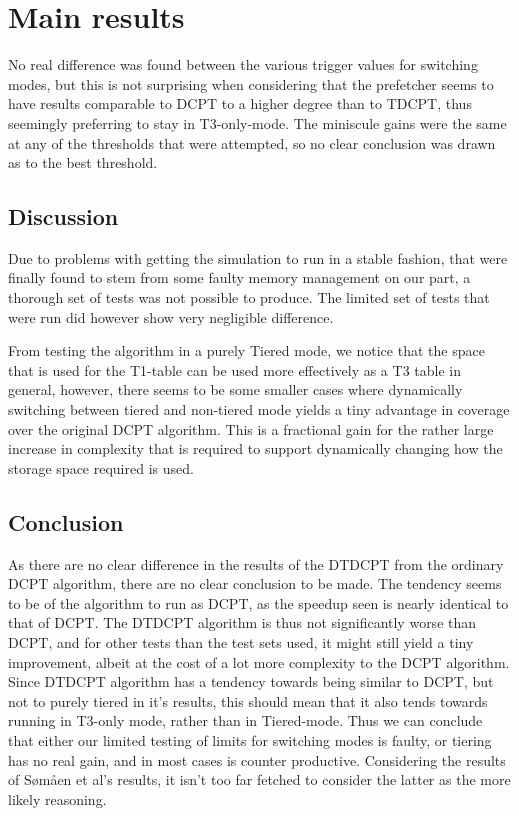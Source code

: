 \section{Main results}
No real difference was found between the various trigger values for switching modes,
but this is not surprising when considering that the prefetcher seems to have results
comparable to DCPT to a higher degree than to TDCPT, thus seemingly preferring to stay
in T3-only-mode. The miniscule gains were the same at any of the thresholds that were
attempted, so no clear conclusion was drawn as to the best threshold.

\subsection{Discussion}
Due to problems with getting the simulation to run in a stable fashion, that
were finally found to stem from some faulty memory management on our part, a
thorough set of tests was not possible to produce. The limited set of tests
that were run did however show very negligible difference.

From testing the algorithm in a purely Tiered mode, we notice that the
space that is used for the T1-table can be used more effectively as a T3
table in general, however, there seems to be some smaller cases where dynamically
switching between tiered and non-tiered mode yields a tiny advantage in coverage
over the original DCPT algorithm. This is a fractional gain for the rather
large increase in complexity that is required to support dynamically changing how
the storage space required is used.

\subsection{Conclusion}
As there are no clear difference in the results of the DTDCPT from the ordinary
DCPT algorithm, there are no clear conclusion to be made. The tendency seems to
be of the algorithm to run as DCPT, as the speedup seen is nearly identical to
that of DCPT. The DTDCPT algorithm is thus not significantly worse than DCPT, and for other
tests than the test sets used, it might still yield a tiny improvement, albeit at the cost
of a lot more complexity to the DCPT algorithm. Since DTDCPT algorithm has a tendency towards
being similar to DCPT, but not to purely tiered in it's results, this should mean that it also
tends towards running in T3-only mode, rather than in Tiered-mode. Thus we can conclude that either
our limited testing of limits for switching modes is faulty, or tiering has no real gain, and in most
cases is counter productive. Considering the results of Sømåen et al's results, it isn't too far fetched
to consider the latter as the more likely reasoning.

